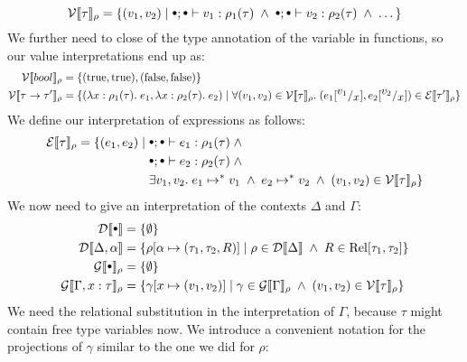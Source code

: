 \[
  \vprep{\tau} = \{(v_1,v_2) \vbar \mtenv ; \mtenv \vdash v_1 : \rho_1(\tau) \pand \mtenv ; \mtenv \vdash v_2 : \rho_2(\tau) \pand\dots \}
\]
We further need to close of the type annotation of the variable in functions, so our value interpretations end up as:
\begin{align*}
  \mathcal{V}\llbracket bool \rrbracket_{\rho}                 & = \{ (\text{true},\text{true}), (\text{false},\text{false}) \} \\
  \mathcal{V}\llbracket  \tau \rightarrow \tau' \rrbracket_{\rho} & = \{ (\lambda x : \rho_1(\tau) . \; e_1,\lambda x : \rho_2(\tau) . \; e_2) \; | \; \forall (v_1,v_2) \in \mathcal{V}\llbracket \tau \rrbracket_{\rho}. \; (e_1[^{\textstyle v_1}/_{\textstyle x}],e_2[^{\textstyle v_2}/_{\textstyle x}]) \in \mathcal{E}\llbracket \tau' \rrbracket_{\rho} \}
\end{align*}
We define our interpretation of expressions as follows:
\begin{align*}
  \eprep{\tau} = \{(e_1,e_2) \vbar & \mtenv ; \mtenv \vdash e_1 : \rho_1(\tau) \pand \\
                                   & \mtenv ; \mtenv \vdash e_2 : \rho_2(\tau) \pand \\
                                   &  \exists v_1,v_2.\; e_1 \evaltos v_1 \pand
                                            e_2 \evaltos v_2 \pand
                                            (v_1,v_2) \in \vprep{\tau} \}
\end{align*}
We now need to give an interpretation of the contexts $\Delta$ and $\Gamma$:
\begin{align*}
  \dpred{\mtenv}         &= \{\emptyset \} \\
  \dpred{\Delta, \alpha} &= \{\extsub{\rho}{\alpha}{(\tau_1,\tau_2,R)} \vbar 
                                 \rho \in \dpred{\Delta} \pand 
                                 R \in \Rel[\tau_1,\tau_2] \} \\
  \gprep{\mtenv}         &= \{\emptyset \} \\
  \gprep{\Gamma, x:\tau} &= \{\extsub{\gamma}{x}{(v_1,v_2)} \vbar 
                                 \gamma \in \gprep{\Gamma} \pand
                                 (v_1,v_2) \in \vprep{\tau}\}
\end{align*}
We need the relational substitution in the interpretation of $\Gamma$, because $\tau$ might contain free type variables now.
We introduce a convenient notation for the projections of $\gamma$ similar to the one we did for $\rho$: %
